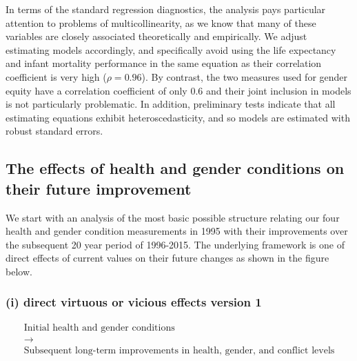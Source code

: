 \documentclass[12pt]{article}
\begin{document}
% 

In terms of the standard regression diagnostics, the analysis pays particular attention to problems of multicollinearity, as we know that many of these variables are closely associated theoretically and empirically. We adjust estimating models accordingly, and specifically avoid using the life expectancy and infant mortality performance in the same equation as their correlation coefficient is very high ($\rho = 0.96$).  By contrast, the two measures used for gender equity have a correlation coefficient of only 0.6 and their joint inclusion in models is not particularly problematic. In addition, preliminary tests indicate that all estimating equations exhibit heteroscedasticity, and so models are estimated with robust standard errors.

\subsection{The effects of health and gender conditions on their future improvement}

We start with an analysis of the most basic possible structure relating our four health and gender condition measurements in 1995 with their improvements over the subsequent 20 year period of 1996-2015. The underlying framework is one of direct effects of current values on their future changes as shown in the figure below.

\subsubsection*{(i) direct virtuous or vicious effects version 1}

\begin{equation*}\begin{gathered}
\text{Initial health and gender conditions} \\
\longrightarrow \\
\text{Subsequent long-term improvements in health, gender, and conflict levels}
\end{gathered}\end{equation*}
\bigskip
\end{document}
